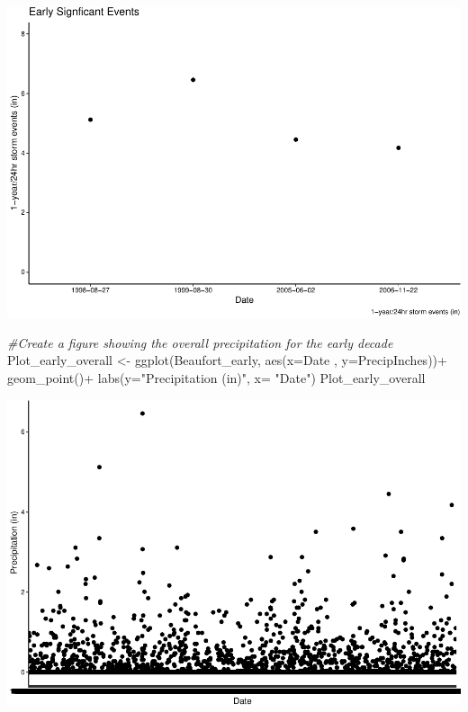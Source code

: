 \documentclass[
  12pt,
]{article}
\newenvironment{Shaded}{\begin{snugshade}}{\end{snugshade}}
\newcommand{\AttributeTok}[1]{\textcolor[rgb]{0.77,0.63,0.00}{#1}}
\newcommand{\CommentTok}[1]{\textcolor[rgb]{0.56,0.35,0.01}{\textit{#1}}}
\newcommand{\FunctionTok}[1]{\textcolor[rgb]{0.00,0.00,0.00}{#1}}
\newcommand{\NormalTok}[1]{#1}
\newcommand{\OtherTok}[1]{\textcolor[rgb]{0.56,0.35,0.01}{#1}}
\newcommand{\SpecialCharTok}[1]{\textcolor[rgb]{0.00,0.00,0.00}{#1}}
\newcommand{\StringTok}[1]{\textcolor[rgb]{0.31,0.60,0.02}{#1}}
\begin{document}
\includegraphics{Final_Project_Thornton_Katayama_Ngenzi_files/figure-latex/early-1.pdf}

\begin{Shaded}
\begin{Highlighting}[]
\CommentTok{\#Create a figure showing the overall precipitation for the early decade}
\NormalTok{Plot\_early\_overall }\OtherTok{\textless{}{-}} \FunctionTok{ggplot}\NormalTok{(Beaufort\_early, }\FunctionTok{aes}\NormalTok{(}\AttributeTok{x=}\NormalTok{Date , }\AttributeTok{y=}\NormalTok{PrecipInches))}\SpecialCharTok{+}
  \FunctionTok{geom\_point}\NormalTok{()}\SpecialCharTok{+}
  \FunctionTok{labs}\NormalTok{(}\AttributeTok{y=}\StringTok{"Precipitation (in)"}\NormalTok{, }\AttributeTok{x=} \StringTok{"Date"}\NormalTok{)}
\NormalTok{Plot\_early\_overall}
\end{Highlighting}
\end{Shaded}

\includegraphics{Final_Project_Thornton_Katayama_Ngenzi_files/figure-latex/early-2.pdf}
\end{document}
